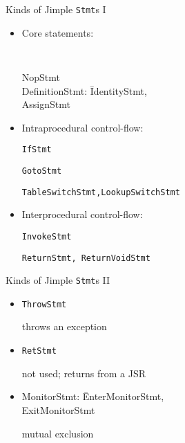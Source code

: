 \begin{slide}{Kinds of Jimple {\tt Stmt}s I}
\vspace*{-0.1in}
\begin{itemize}
\item Core statements:
\vspace*{-0.1in}
{\tt 
\begin{tabbing}
\quad NopStmt \\
\quad DefinitionStmt: \= IdentityStmt, \\
                \>AssignStmt 
\end{tabbing}}

\vspace*{-0.1in}
\item Intraprocedural control-flow:

{\tt \quad IfStmt}

{\tt \quad GotoStmt}

{\tt \quad TableSwitchStmt,LookupSwitchStmt}

\item Interprocedural control-flow:

{\tt \quad InvokeStmt}

{\tt \quad ReturnStmt, ReturnVoidStmt}

\end{itemize}
\end{slide}

\begin{slide}{Kinds of Jimple {\tt Stmt}s II}
\begin{itemize}
\item {\tt ThrowStmt}

\qquad throws an exception

\item {\tt RetStmt}

\qquad not used; returns from a JSR

\item {\tt \begin{tabbing}
MonitorStmt: \= EnterMonitorStmt, \\
                  \> ExitMonitorStmt
\end{tabbing}}

\qquad mutual exclusion
\end{itemize}
\end{slide}

